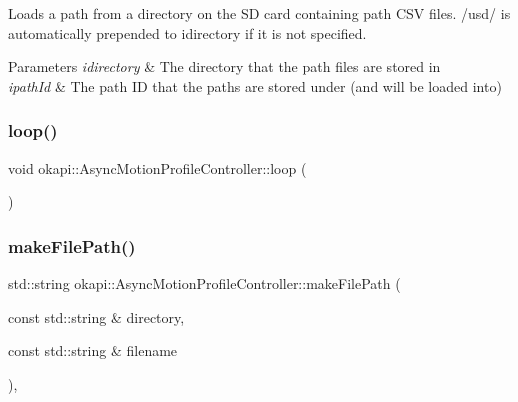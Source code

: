 Loads a path from a directory on the SD card containing path C\+SV files. {\ttfamily /usd/} is automatically prepended to {\ttfamily idirectory} if it is not specified.


\begin{DoxyParams}{Parameters}
{\em idirectory} & The directory that the path files are stored in \\
\hline
{\em ipath\+Id} & The path ID that the paths are stored under (and will be loaded into) \\
\hline
\end{DoxyParams}
\mbox{\label{classokapi_1_1AsyncMotionProfileController_a8a41524c4cc3352e2eda15dfe3e7ad27}} 
\subsubsection{\texorpdfstring{loop()}{loop()}}
{\footnotesize\ttfamily void okapi\+::\+Async\+Motion\+Profile\+Controller\+::loop (\begin{DoxyParamCaption}{ }\end{DoxyParamCaption})\hspace{0.3cm}{\ttfamily [protected]}}

\mbox{\label{classokapi_1_1AsyncMotionProfileController_a3380054b3feb2679fe5b919095959826}} 
\subsubsection{\texorpdfstring{makeFilePath()}{makeFilePath()}}
{\footnotesize\ttfamily std\+::string okapi\+::\+Async\+Motion\+Profile\+Controller\+::make\+File\+Path (\begin{DoxyParamCaption}\item[{const std\+::string \&}]{directory,  }\item[{const std\+::string \&}]{filename }\end{DoxyParamCaption})\hspace{0.3cm}{\ttfamily [static]}, {\ttfamily [protected]}}

